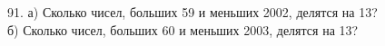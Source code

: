 91. а) Сколько чисел, больших 59 и меньших 2002, делятся на 13?\\
б) Сколько чисел, больших 60 и меньших 2003, делятся на 13?\\
